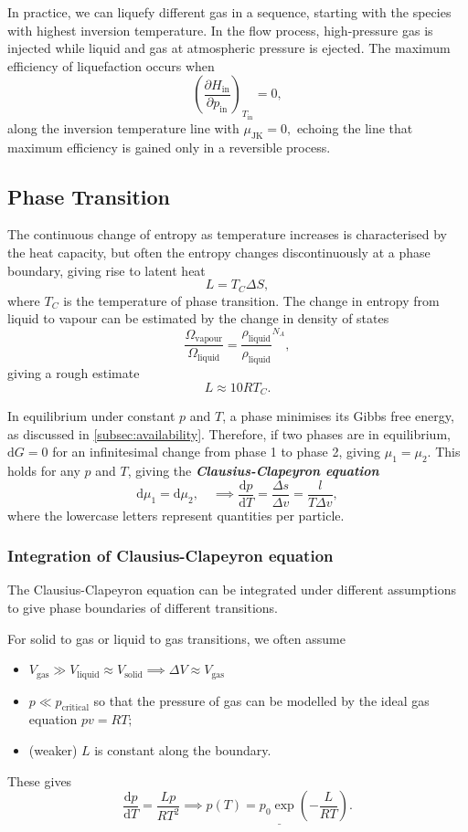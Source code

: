 \documentclass{article}
\theoremstyle{nonumberplain}
\begin{document}
In practice, we can liquefy different gas in a sequence, starting with the species with highest inversion temperature. In the flow process, high-pressure gas is injected while liquid and gas at atmospheric pressure is ejected. The maximum efficiency of liquefaction occurs when 
\[
    \left(\frac{\partial H_{\mathrm{in}}}{\partial p_\mathrm{in}}  \right)_{T_\mathrm{in}} = 0,
\] along the inversion temperature line with $\mu_{\mathrm{JK} } = 0,$ echoing the line that maximum efficiency is gained only in a reversible process. 

\subsection{Phase Transition}
The continuous change of entropy as temperature increases is characterised by the heat capacity, but often the entropy changes discontinuously at a phase boundary, giving rise to latent heat 
\[
    \boxed{
    L = T_C \Delta S,}
\]
where $T_C$ is the temperature of phase transition. The change in entropy from liquid to vapour can be estimated by the change in density of states 
\[
    \frac{\Omega_{\mathrm{vapour} }}{\Omega_{\mathrm{liquid} }} = \frac{\rho_{\mathrm{liquid} }}{\rho_{\mathrm{liquid} }}^{N_A}, 
\]
giving a rough estimate 
\[
    L \approx 10 R T_C. 
\]

In equilibrium under constant $p$ and $T$, a phase minimises its Gibbs free energy, as discussed in \ref{subsec:availability}. Therefore, if two phases are in equilibrium, $\mathrm{d} G = 0$ for an infinitesimal change from phase 1 to phase 2, giving $\mu_1 = \mu_2.$ This holds for any $p$ and $T$, giving the \textit{\textbf{Clausius-Clapeyron equation}} 
\[
    \mathrm{d} \mu_1 = \mathrm{d} \mu_2, \quad 
    \implies  
    \boxed{
        \frac{\mathrm{d}p}{\mathrm{d}T} = \frac{\Delta s}{\Delta v} = \frac{l}{T \Delta v},  
    }
\]
where the lowercase letters represent quantities per particle. 
\subsubsection{Integration of Clausius-Clapeyron equation}
The Clausius-Clapeyron equation can be integrated under different assumptions to give phase boundaries of different transitions. 

For solid to gas or liquid to gas transitions, we often assume 
\begin{itemize}
    \item $V_{\mathrm{gas} } \gg  V_{\mathrm{liquid} } \approx V_{\mathrm{solid} } \implies \Delta V \approx V_{\mathrm{gas} }$
    \item $p \ll p_{\mathrm{critical}}$ so that the pressure of gas can be modelled by the ideal gas equation $p v = R T;$
    \item (weaker) $L$ is constant along the boundary.
\end{itemize}
These gives
\[
    \frac{\mathrm{d}p}{\mathrm{d}T} = \frac{L p}{R T^{2}}
    \implies  
    \underline{p(T) = p_0 \exp \left( -\frac{L}{RT}\right).} 
\]
\end{document}
